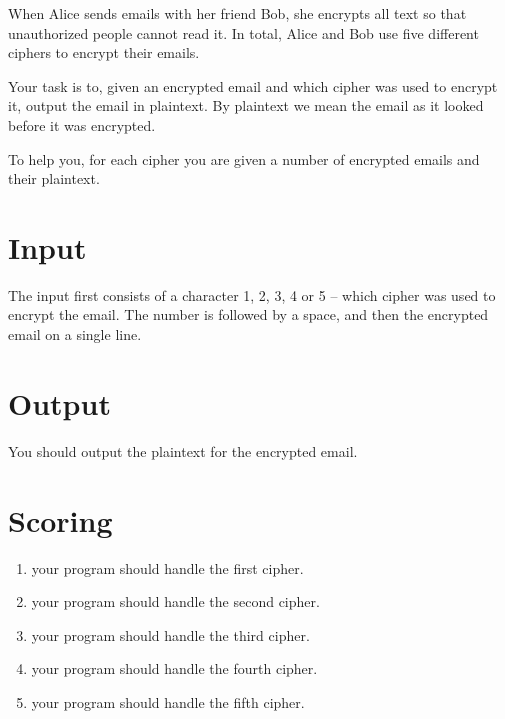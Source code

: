 
When Alice sends emails with her friend Bob, she encrypts all text so that unauthorized people cannot read it. In total, Alice and Bob use five different ciphers to encrypt their emails.

Your task is to, given an encrypted email and which cipher was used to encrypt it, output the email in plaintext. By plaintext we mean the email as it looked before it was encrypted.

To help you, for each cipher you are given a number of encrypted emails and their plaintext.

\section*{Input}
The input first consists of a character 1, 2, 3, 4 or 5 -- which cipher was used to encrypt the email. The number is followed by a space, and then the encrypted email on a single line.

\section*{Output}
You should output the plaintext for the encrypted email.

\section*{Scoring}

\begin{enumerate}
	\item[10 points] your program should handle the first cipher.
	\item[15 points] your program should handle the second cipher.
	\item[25 points] your program should handle the third cipher.
	\item[25 points] your program should handle the fourth cipher.
	\item[40 points] your program should handle the fifth cipher.
\end{enumerate}
